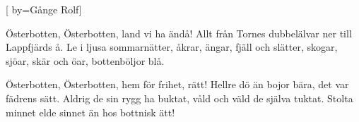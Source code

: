 
[
  by={Gånge Rolf}]

\beginverse*
Österbotten, Österbotten,
land vi ha ändå!
Allt från Tornes dubbelälvar
ner till Lappfjärds å.
Le i ljusa sommarnätter,
åkrar, ängar, fjäll och slätter,
skogar, sjöar, skär och öar,
bottenböljor blå.
\endverse

\beginverse*
Österbotten, Österbotten,
hem för frihet, rätt!
Hellre dö än bojor bära,
det var fädrens sätt.
Aldrig de sin rygg ha buktat,
våld och väld de själva tuktat.
Stolta minnet elde sinnet
än hos bottnisk ätt!
\endverse
\endsong